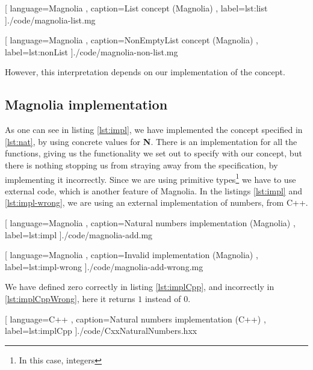 \begin{center}
  
    [ language=Magnolia
    , caption={List concept (Magnolia)}
    , label=lst:list
    ]{./code/magnolia-list.mg}
\end{center}

\begin{center}
  
    [ language=Magnolia
    , caption={NonEmptyList concept (Magnolia)}
    , label=lst:nonList
    ]{./code/magnolia-non-list.mg}
\end{center}

However, this interpretation depends on our implementation of the concept.

\subsection{Magnolia implementation}

As one can see in listing \ref{lst:impl}, we have implemented the concept
specified in \ref{lst:nat}, by using concrete values for \textbf{N}. There is an
implementation for all the functions, giving us the functionality we set out to
specify with our concept, but there is nothing stopping us from straying away
from the specification, by implementing it incorrectly. Since we are using
primitive types\footnote{In this case, integers} we have to use external code, which is
another feature of Magnolia. In the listings \ref{lst:impl} and
\ref{lst:impl-wrong}, we are using an external implementation of numbers, from
C++.

\begin{code}[H]
  
    [ language=Magnolia
    , caption={Natural numbers implementation (Magnolia)}
    , label=lst:impl
    ]{./code/magnolia-add.mg}
\end{code}

\begin{code}[H]
  
    [ language=Magnolia
    , caption={Invalid implementation (Magnolia)}
    , label=lst:impl-wrong
    ]{./code/magnolia-add-wrong.mg}
\end{code}

We have defined zero correctly in listing \ref{lst:implCpp}, and incorrectly in
\ref{lst:implCppWrong}, here it returns $1$ instead of $0$.

\begin{code}[H]
  
    [ language=C++
    , caption={Natural numbers implementation (C++)}
    , label=lst:implCpp
    ]{./code/CxxNaturalNumbers.hxx}
\end{code}

